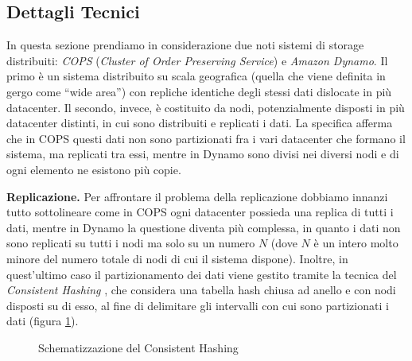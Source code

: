 \documentclass[twoside]{article}
\begin{document}
\begin{multicols}{2}
\section{Dettagli Tecnici}
\label{sec:dettagli-tecnici}
In questa sezione prendiamo in considerazione due noti sistemi di storage distribuiti: \emph{COPS} (\emph{Cluster of Order Preserving Service})\cite{bib:COPS} e \emph{Amazon Dynamo}\cite{bib:dynamo}. Il primo è un sistema distribuito su scala geografica (quella che viene definita in gergo come “wide area”) con repliche identiche degli stessi dati dislocate in più datacenter. Il secondo, invece, è costituito da nodi, potenzialmente disposti in più datacenter distinti, in cui sono distribuiti e replicati i dati. La specifica afferma che in COPS questi dati non sono partizionati fra i vari datacenter che formano il sistema, ma replicati tra essi, mentre in Dynamo sono divisi nei diversi nodi e di ogni elemento ne esistono più copie.

\textbf{Replicazione.} Per affrontare il problema della replicazione dobbiamo innanzi tutto sottolineare come in COPS ogni datacenter possieda una replica di tutti i dati, mentre in Dynamo la questione diventa più complessa, in quanto i dati non sono replicati su tutti i nodi ma solo su un numero $N$ (dove $N$ è un intero molto minore del numero totale di nodi di cui il sistema dispone). Inoltre, in quest'ultimo caso il partizionamento dei dati viene gestito tramite la tecnica del \emph{Consistent Hashing} \cite{bib:hashing}, che considera una tabella hash chiusa ad anello e con nodi disposti su di esso, al fine di delimitare gli intervalli con cui sono partizionati i dati (figura \ref{fig:consistent-hashing-ring}).
\begin{figure}[H]
\centering
{}
\caption{Schematizzazione del Consistent Hashing}
\label{fig:consistent-hashing-ring}
\end{figure}


\end{multicols}
\end{document}
